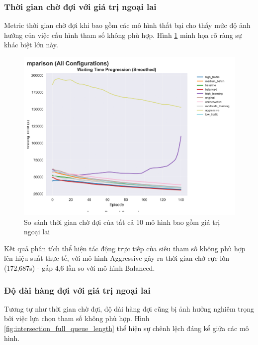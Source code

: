 \subsubsection{Thời gian chờ đợi với giá trị ngoại lai}
Metric thời gian chờ đợi khi bao gồm các mô hình thất bại cho thấy mức độ ảnh hưởng của việc cấu hình tham số không phù hợp. Hình \ref{fig:intersection_full_waiting_time} minh họa rõ ràng sự khác biệt lớn này.

\begin{figure}[!htp]
    \centering
    \includegraphics[width=\textwidth]{
        figures/individual_plots/intersection_full_waiting_time.png
    }
    \caption{So sánh thời gian chờ đợi của tất cả 10 mô hình bao gồm giá trị ngoại lai}
    \label{fig:intersection_full_waiting_time}
\end{figure}

Kết quả phân tích thể hiện tác động trực tiếp của siêu tham số không phù hợp lên hiệu suất thực tế, với mô hình Aggressive gây ra thời gian chờ cực lớn (172,687s) - gấp 4,6 lần so với mô hình Balanced.

\subsubsection{Độ dài hàng đợi với giá trị ngoại lai}
Tương tự như thời gian chờ đợi, độ dài hàng đợi cũng bị ảnh hưởng nghiêm trọng bởi việc lựa chọn tham số không phù hợp. Hình \ref{fig:intersection_full_queue_length} thể hiện sự chênh lệch đáng kể giữa các mô hình.

